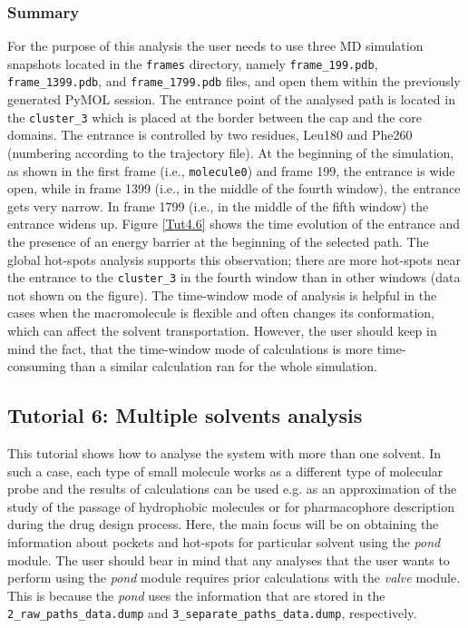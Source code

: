 \documentclass[9pt,tutorial]{livecoms}
\begin{document}
\subsubsection{Summary}
For the purpose of this analysis the user needs to use three MD simulation snapshots located in the \texttt{frames} directory, namely \texttt{frame\_199.pdb}, \texttt{frame\_1399.pdb}, and \texttt{frame\_1799.pdb} files, and open them within the previously generated PyMOL session. The entrance point of the analysed path is located in the \texttt{cluster\_3} which is placed at the border between the cap and the core domains. The entrance is controlled by two residues, Leu180 and Phe260 (numbering according to the trajectory file). At the beginning of the simulation, as shown in the first frame (i.e., \texttt{molecule0}) and frame 199, the entrance is wide open, while in frame 1399 (i.e., in the middle of the fourth window), the entrance gets very narrow. In frame 1799 (i.e., in the middle of the fifth window) the entrance widens up. Figure \ref{Tut4.6} shows the time evolution of the entrance and the presence of an energy barrier at the beginning of the selected path. The global hot-spots analysis supports this observation; there are more hot-spots near the entrance to the \texttt{cluster\_3} in the fourth window than in other windows (data not shown on the figure). The time-window mode of analysis is helpful in the cases when the macromolecule is flexible and often changes its conformation, which can affect the solvent transportation. However, the user should keep in mind the fact, that the time-window mode of calculations is more time-consuming than a similar calculation ran for the whole simulation.
\pagebreak

\subsection{Tutorial 6: Multiple solvents analysis}

This tutorial shows how to analyse the system with more than one solvent. In such a case, each type of small molecule works as a different type of molecular probe and the results of calculations can be used e.g. as an approximation of the study of the passage of hydrophobic molecules or for pharmacophore description during the drug design process. Here, the main focus will be on obtaining the information about pockets and hot-spots for particular solvent using the \emph{pond} module. The user should bear in mind that any analyses that the user wants to perform using the \emph{pond} module requires prior calculations with the \emph{valve} module. This is because the \emph{pond} uses the information that are stored in the \texttt{2\_raw\_paths\_data.dump} and \texttt{3\_separate\_paths\_data.dump}, respectively. 
\end{document}
